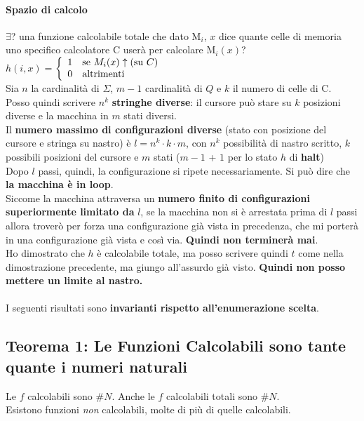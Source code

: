 \documentclass[10pt]{book}
\begin{document}
\paragraph{Spazio di calcolo} $\exists$? una funzione calcolabile totale che dato M$_i$, $x$ dice quante celle di memoria uno specifico calcolatore C userà per calcolare M$_i(x)$?\\
$h(i, x) = $\begin{math}
\left\{
\begin{array}{l l}
	1 & \text{se }M_i(x)\uparrow (\text{su }C)\\
	0 & \text{altrimenti}
\end{array}
\right.
\end{math}\\
Sia $n$ la cardinalità di $\Sigma$, $m - 1$ cardinalità di $Q$ e $k$ il numero di celle di C.\\
Posso quindi scrivere $n^k$ \textbf{stringhe diverse}: il cursore può stare su $k$ posizioni diverse e la macchina in $m$ stati diversi.\\
Il \textbf{numero massimo di configurazioni diverse} (stato con posizione del cursore e stringa su nastro) è  $l = n^k \cdot k \cdot m$, con $n^k$ possibilità di nastro scritto, $k$ possibili posizioni del cursore e $m$ stati ($m - 1$ + $1$ per lo stato $h$ di \textbf{halt})\\
Dopo $l$ passi, quindi, la configurazione si ripete necessariamente. Si può dire che \textbf{la macchina è in loop}.\\
Siccome la macchina attraversa un \textbf{numero finito di configurazioni superiormente limitato da} $l$, se la macchina non si è arrestata prima di $l$ passi allora troverò per forza una configurazione già vista in precedenza, che mi porterà in una configurazione già vista e così via. \textbf{Quindi non terminerà mai}.\\
Ho dimostrato che $h$ è calcolabile totale, ma posso scrivere quindi $t$ come nella dimostrazione precedente, ma giungo all'assurdo già visto. \textbf{Quindi non posso mettere un limite al nastro.}\\\\
I seguenti risultati sono \textbf{invarianti rispetto all'enumerazione scelta}.
\subsection{Teorema 1: Le Funzioni Calcolabili sono tante quante i numeri naturali}
Le $f$ calcolabili sono \#$N$. Anche le $f$ calcolabili totali sono \#$N$.\\
Esistono funzioni \textit{non} calcolabili, molte di più di quelle calcolabili.
\end{document}
